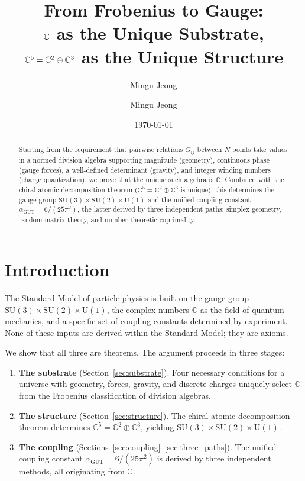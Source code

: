 \documentclass[12pt]{amsart}
\title{From Frobenius to Gauge:\\
  $\CC$ as the Unique Substrate,\\
  $\CC^5 = \CC^2 \oplus \CC^3$ as the Unique Structure}
\author{Mingu Jeong}
\author{Mingu Jeong}
\date{\today}
\theoremstyle{definition}
\theoremstyle{remark}
\newcommand{\CC}{\mathbb{C}}
\newcommand{\agut}{\alpha_{\mathrm{GUT}}}
\begin{document}
\begin{abstract}
Starting from the requirement that pairwise
relations $G_{ij}$ between $N$ points take
values in a normed division algebra
supporting magnitude (geometry),
continuous phase (gauge forces),
a well-defined determinant (gravity),
and integer winding numbers (charge quantization),
we prove that the unique such algebra is $\CC$.
Combined with the chiral atomic decomposition
theorem ($\CC^5 = \CC^2 \oplus \CC^3$ is unique),
this determines the gauge group
$\mathrm{SU}(3) \times \mathrm{SU}(2) \times \mathrm{U}(1)$
and the unified coupling constant
$\agut = 6 / (25\pi^2)$,
the latter derived by three independent paths:
simplex geometry, random matrix theory,
and number-theoretic coprimality.
\end{abstract}

\maketitle
\tableofcontents

\section{Introduction}

The Standard Model of particle physics is built on
the gauge group
$\mathrm{SU}(3) \times \mathrm{SU}(2) \times \mathrm{U}(1)$,
the complex numbers $\CC$ as the field of quantum mechanics,
and a specific set of coupling constants
determined by experiment.
None of these inputs are derived within the Standard Model;
they are axioms.

We show that all three are theorems.
The argument proceeds in three stages:

\begin{enumerate}[label=(\roman*)]
\item \textbf{The substrate} (Section~\ref{sec:substrate}).
  Four necessary conditions for a universe
  with geometry, forces, gravity, and discrete
  charges uniquely select $\CC$
  from the Frobenius classification of
  division algebras.

\item \textbf{The structure}
  (Section~\ref{sec:structure}).
  The chiral atomic decomposition theorem
  \cite{Paper1} determines
  $\CC^5 = \CC^2 \oplus \CC^3$,
  yielding
  $\mathrm{SU}(3) \times \mathrm{SU}(2)
  \times \mathrm{U}(1)$.

\item \textbf{The coupling}
  (Sections~\ref{sec:coupling}--\ref{sec:three_paths}).
  The unified coupling constant
  $\agut = 6/(25\pi^2)$ is derived
  by three independent methods,
  all originating from $\CC$.
\end{enumerate}
\end{document}
